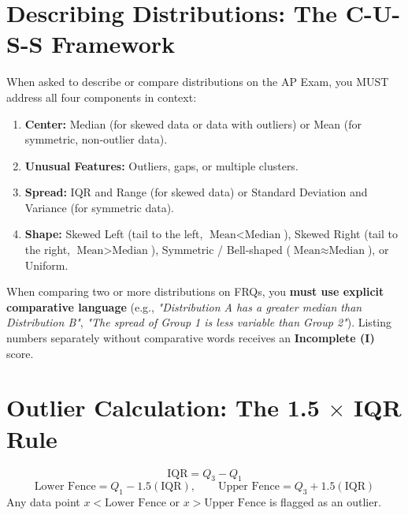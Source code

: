 ﻿\documentclass[11pt,oneside,openany]{book}
\begin{document}
\section{Describing Distributions: The C-U-S-S Framework}
When asked to describe or compare distributions on the AP Exam, you MUST address all four components in context:
\begin{enumerate}[leftmargin=1.5em]
  \item \textbf{Center:} Median (for skewed data or data with outliers) or Mean (for symmetric, non-outlier data).
  \item \textbf{Unusual Features:} Outliers, gaps, or multiple clusters.
  \item \textbf{Spread:} IQR and Range (for skewed data) or Standard Deviation and Variance (for symmetric data).
  \item \textbf{Shape:} Skewed Left (tail to the left, $\text{Mean} < \text{Median}$), Skewed Right (tail to the right, $\text{Mean} > \text{Median}$), Symmetric / Bell-shaped ($\text{Mean} \approx \text{Median}$), or Uniform.
\end{enumerate}

\begin{trapbox}
When comparing two or more distributions on FRQs, you \textbf{must use explicit comparative language} (e.g., \textit{"Distribution A has a greater median than Distribution B"}, \textit{"The spread of Group 1 is less variable than Group 2"}). Listing numbers separately without comparative words receives an \textbf{Incomplete (I)} score.
\end{trapbox}

\section{Outlier Calculation: The 1.5 $\times$ IQR Rule}
\begin{equation}
  \text{IQR} = Q_3 - Q_1
\end{equation}
\begin{equation}
  \text{Lower Fence} = Q_1 - 1.5(\text{IQR}), \qquad \text{Upper Fence} = Q_3 + 1.5(\text{IQR})
\end{equation}
Any data point $x < \text{Lower Fence}$ or $x > \text{Upper Fence}$ is flagged as an outlier.
\end{document}
